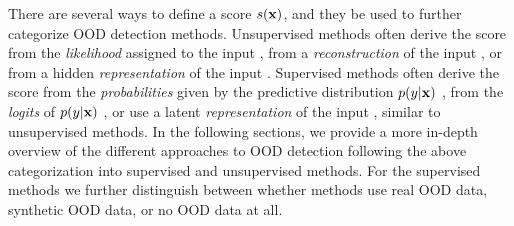 There are several ways to define a score $s({\mathbf{x}})$, and they be used to further categorize OOD detection methods. 
Unsupervised methods often derive the score 
from the \emph{likelihood} assigned to the input \parencite{bishop_novelty_1994,choi_waic_2019,kirichenko_why_2020,ren_likelihood_2019,serra_input_2020,xiao_likelihood_2020,morningstar_density_2021,nalisnick_detecting_2019,bergamin_modelagnostic_2022,maaloe_biva_2019,havtorn_hierarchical_2021}, 
from a \emph{reconstruction} of the input \parencite{sakurada_anomaly_2014,xia_learning_2015,lyudchik_outlier_2016,zhou_anomaly_2017,chen_outlier_2017,schlegl_unsupervised_2017,zong_deep_2018,li_madgan_2019,graham_denoising_2023,liu_unsupervised_2023a}, or 
from a hidden \emph{representation} of the input \parencite{denouden_improving_2018,hendrycks_using_2019,ahmadian_likelihoodfree_2021,bergman_classificationbased_2020,tack_csi_2020,sehwag_ssd_2021,xiao_we_2021}.  %
Supervised methods often derive the score 
from the \emph{probabilities} given by the predictive distribution $p(y|{\mathbf{x}})$ \parencite{hendrycks_baseline_2017,hendrycks_scaling_2022}, 
from the \emph{logits} of $p(y|{\mathbf{x}})$ \parencite{hendrycks_scaling_2022,liu_energybased_2020}, or 
use a latent \emph{representation} of the input \parencite{lee_simple_2018,li_anomaly_2019,ndiour_outofdistribution_2020,cook_outlier_2020,zaeemzadeh_outofdistribution_2021}, similar to unsupervised methods. 
In the following sections, we provide a more in-depth overview of the different approaches to OOD detection following the above categorization into supervised and unsupervised methods. For the supervised methods we further distinguish between whether methods use real OOD data, synthetic OOD data, or no OOD data at all. 

